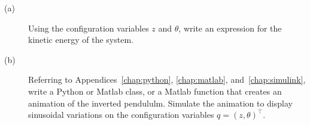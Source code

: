 \begin{description}
\item[(a)]  Using the configuration variables $z$ and $\theta$, write an expression for the kinetic energy of the system.
\item[(b)]  Referring to Appendices~\ref{chap:python}, \ref{chap:matlab}, and~\ref{chap:simulink}, write a Python or Matlab class, or a Matlab function that creates an animation of the inverted pendululm.  Simulate the animation to display sinusoidal variations on the configuration variables $q=(z, \theta)^\top$. 
\end{description}
